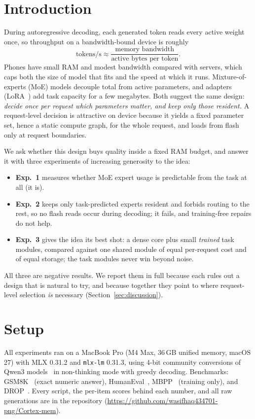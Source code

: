\documentclass[11pt]{article}
\newcommand{\repourl}{https://github.com/wasifhaq434701-png/Cortex-mem}
\begin{document}
\section{Introduction}
During autoregressive decoding, each generated token reads every active weight once, so throughput on a
bandwidth-bound device is roughly
\begin{equation}
\text{tokens/s} \approx \frac{\text{memory bandwidth}}{\text{active bytes per token}} .
\end{equation}
Phones have small RAM and modest bandwidth compared with servers, which caps both the size of model that
fits and the speed at which it runs. Mixture-of-experts (MoE) models decouple total from active
parameters, and adapters (LoRA~\cite{hu2021lora}) add task capacity for a few megabytes. Both suggest
the same design: \emph{decide once per request which parameters matter, and keep only those resident.}
A request-level decision is attractive on device because it yields a fixed parameter set, hence a
static compute graph, for the whole request, and loads from flash only at request boundaries.

We ask whether this design buys quality inside a fixed RAM budget, and answer it with three experiments
of increasing generosity to the idea:
\begin{itemize}\raggedright
\item \textbf{Exp.~1} measures whether MoE expert usage is predictable from the task at all (it is).
\item \textbf{Exp.~2} keeps only task-predicted experts resident and forbids routing to the rest, so no
flash reads occur during decoding; it fails, and training-free repairs do not help.
\item \textbf{Exp.~3} gives the idea its best shot: a dense core plus small \emph{trained} task modules,
compared against one shared module of equal per-request cost and of equal storage; the task modules
never win beyond noise.
\end{itemize}
All three are negative results. We report them in full because each rules out a design that is natural
to try, and because together they point to where request-level selection \emph{is} necessary
(Section~\ref{sec:discussion}).

\section{Setup}
All experiments ran on a MacBook Pro (M4 Max, 36\,GB unified memory, macOS 27) with MLX 0.31.2 and
\texttt{mlx-lm} 0.31.3, using 4-bit community conversions of Qwen3 models~\cite{qwen3} in non-thinking
mode with greedy decoding. Benchmarks: GSM8K~\cite{cobbe2021gsm8k} (exact numeric answer),
HumanEval~\cite{chen2021humaneval}, MBPP~\cite{austin2021mbpp} (training only), and
DROP~\cite{dua2019drop}. Every script, the per-item scores behind each number, and all raw generations
are in the repository (\url{\repourl}).
\end{document}

